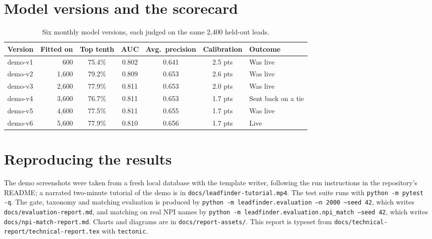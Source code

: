 \documentclass[11pt]{article}
\newcommand{\code}[1]{\texttt{\small #1}}
\begin{document}
\section{Model versions and the scorecard}
\label{app:versions}

\begin{table}[H]
\centering
\small
\caption{Six monthly model versions, each judged on the same 2,400 held-out leads.}
\begin{tabular}{@{}lrccccl@{}}
\toprule
Version & Fitted on & Top tenth & AUC & Avg.\ precision & Calibration & Outcome \\
\midrule
demo-v1 & 600 & 75.4\% & 0.802 & 0.641 & 2.5 pts & Was live \\
demo-v2 & 1,600 & 79.2\% & 0.809 & 0.653 & 2.6 pts & Was live \\
demo-v3 & 2,600 & 77.9\% & 0.811 & 0.653 & 2.0 pts & Was live \\
demo-v4 & 3,600 & 76.7\% & 0.811 & 0.653 & 1.7 pts & Sent back on a tie \\
demo-v5 & 4,600 & 77.5\% & 0.811 & 0.655 & 1.7 pts & Was live \\
demo-v6 & 5,600 & 77.9\% & 0.810 & 0.656 & 1.7 pts & Live \\
\bottomrule
\end{tabular}
\end{table}

\section{Reproducing the results}

{\sloppy The demo screenshots were taken from a fresh local database with the template writer, following the run instructions in the repository's README; a narrated two-minute tutorial of the demo is in \code{docs/leadfinder-tutorial.mp4}. The test suite runs with \code{python -m pytest -q}. The gate, taxonomy and matching evaluation is produced by \code{python -m leadfinder.evaluation --n 2000 --seed 42}, which writes \code{docs/evaluation-report.md}, and matching on real NPI names by \code{python -m leadfinder.evaluation.npi\_match --seed 42}, which writes \code{docs/npi-match-report.md}. Charts and diagrams are in \code{docs/report-assets/}. This report is typeset from \code{docs/technical-report/technical-report.tex} with \code{tectonic}.\par}
\end{document}
